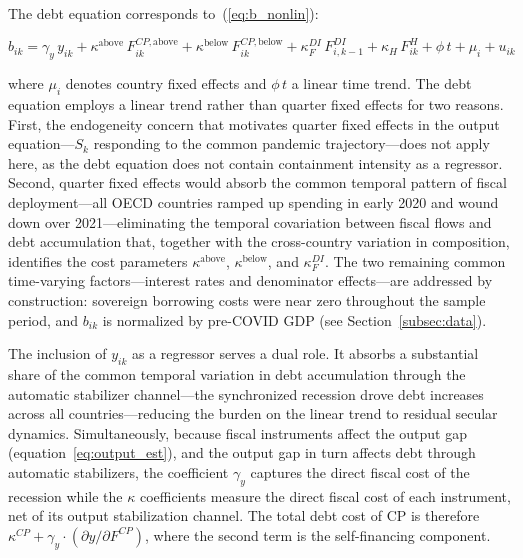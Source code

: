 \documentclass[12pt, a4paper]{article}
\begin{document}
The debt equation corresponds to~(\ref{eq:b_nonlin}):

\begin{equation}
    b_{ik} = \gamma_y\, y_{ik}
    + \kappa^{\text{above}}\, F_{ik}^{CP,\text{above}}
    + \kappa^{\text{below}}\, F_{ik}^{CP,\text{below}}
    + \kappa_F^{DI}\, F_{i,k-1}^{DI}
    + \kappa_H\, F_{ik}^{H}
    + \phi\, t + \mu_i + u_{ik}
    \label{eq:debt_est}
\end{equation}

where $\mu_i$ denotes country fixed effects and $\phi\, t$ a linear time trend.
The debt equation employs a linear trend rather than quarter fixed effects for
two reasons. First, the endogeneity concern that motivates quarter fixed effects
in the output equation---$S_k$ responding to the common pandemic
trajectory---does not apply here, as the debt equation does not contain
containment intensity as a regressor. Second, quarter fixed effects would absorb
the common temporal pattern of fiscal deployment---all OECD countries ramped up
spending in early 2020 and wound down over 2021---eliminating the temporal
covariation between fiscal flows and debt accumulation that, together with the
cross-country variation in composition, identifies the cost parameters
$\kappa^{\text{above}}$, $\kappa^{\text{below}}$, and $\kappa_F^{DI}$. The two
remaining common time-varying factors---interest rates and denominator
effects---are addressed by construction: sovereign borrowing costs were near zero
throughout the sample period, and $b_{ik}$ is normalized by pre-COVID GDP (see
Section~\ref{subsec:data}).

The inclusion of $y_{ik}$ as a regressor serves a dual role. It absorbs a
substantial share of the common temporal variation in debt accumulation through
the automatic stabilizer channel---the synchronized recession drove debt
increases across all countries---reducing the burden on the linear trend to
residual secular dynamics. Simultaneously, because fiscal instruments affect the
output gap (equation~\ref{eq:output_est}), and the output gap in turn affects
debt through automatic stabilizers, the coefficient $\gamma_y$ captures the
direct fiscal cost of the recession while the $\kappa$ coefficients measure
the direct fiscal cost of each instrument, net of its output stabilization
channel. The total debt cost of CP is therefore
$\kappa^{CP} + \gamma_y \cdot (\partial y / \partial F^{CP})$, where the
second term is the self-financing component.
\end{document}

